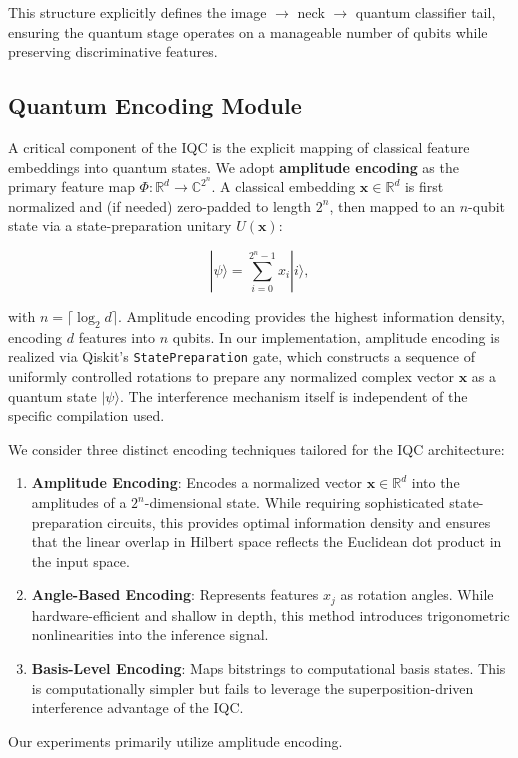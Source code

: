 \documentclass[conference]{IEEEtran}
\begin{document}
This structure explicitly defines the image $\rightarrow$ neck $\rightarrow$ quantum classifier tail, ensuring the quantum stage operates on a manageable number of qubits while preserving discriminative features.

\subsection{Quantum Encoding Module}
A critical component of the IQC is the explicit mapping of classical feature embeddings into quantum states. We adopt \textbf{amplitude encoding} as the primary feature map $\Phi: \mathbb{R}^d \rightarrow \mathbb{C}^{2^n}$. A classical embedding $\mathbf{x} \in \mathbb{R}^d$ is first normalized and (if needed) zero-padded to length $2^n$, then mapped to an $n$-qubit state via a state-preparation unitary $U(\mathbf{x})$:

\begin{equation}
|\psi\rangle = \sum_{i=0}^{2^n - 1} x_i |i\rangle,
\end{equation}

with $n = \lceil \log_2 d \rceil$. Amplitude encoding provides the highest information density, encoding $d$ features into $n$ qubits. In our implementation, amplitude encoding is realized via Qiskit's \texttt{StatePreparation} gate, which constructs a sequence of uniformly controlled rotations to prepare any normalized complex vector $\mathbf{x}$ as a quantum state $|\psi\rangle$. The interference mechanism itself is independent of the specific compilation used.

We consider three distinct encoding techniques tailored for the IQC architecture:
\begin{enumerate}
    \item \textbf{Amplitude Encoding}: Encodes a normalized vector $\mathbf{x} \in \mathbb{R}^d$ into the amplitudes of a $2^n$-dimensional state. While requiring sophisticated state-preparation circuits, this provides optimal information density and ensures that the linear overlap in Hilbert space reflects the Euclidean dot product in the input space.
    \item \textbf{Angle-Based Encoding}: Represents features $x_j$ as rotation angles. While hardware-efficient and shallow in depth, this method introduces trigonometric nonlinearities into the inference signal.
    \item \textbf{Basis-Level Encoding}: Maps bitstrings to computational basis states. This is computationally simpler but fails to leverage the superposition-driven interference advantage of the IQC.
\end{enumerate}
Our experiments primarily utilize amplitude encoding.
\end{document}
